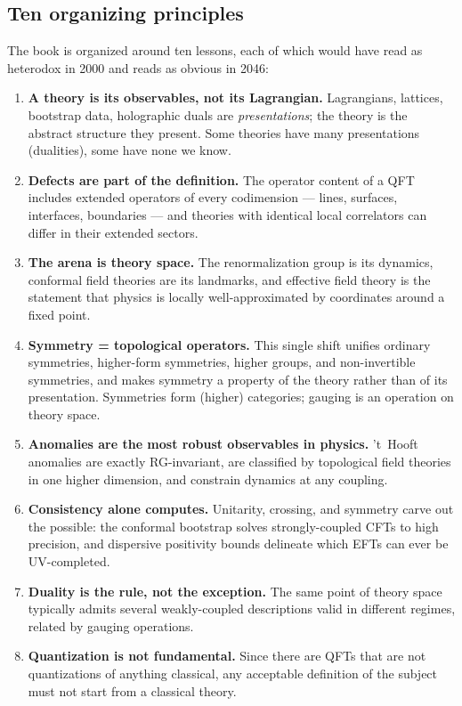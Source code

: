 \subsection*{Ten organizing principles}

The book is organized around ten lessons, each of which would have read as heterodox in 2000 and reads as obvious in 2046:

\begin{enumerate}
\item \textbf{A theory is its observables, not its Lagrangian.} Lagrangians, lattices, bootstrap data, holographic duals are \emph{presentations}; the theory is the abstract structure they present. Some theories have many presentations (dualities), some have none we know.
\item \textbf{Defects are part of the definition.} The operator content of a QFT includes extended operators of every codimension --- lines, surfaces, interfaces, boundaries --- and theories with identical local correlators can differ in their extended sectors.
\item \textbf{The arena is theory space.} The renormalization group is its dynamics, conformal field theories are its landmarks, and effective field theory is the statement that physics is locally well-approximated by coordinates around a fixed point.
\item \textbf{Symmetry = topological operators.} This single shift unifies ordinary symmetries, higher-form symmetries, higher groups, and non-invertible symmetries, and makes symmetry a property of the theory rather than of its presentation. Symmetries form (higher) categories; gauging is an operation on theory space.
\item \textbf{Anomalies are the most robust observables in physics.} 't~Hooft anomalies are exactly RG-invariant, are classified by topological field theories in one higher dimension, and constrain dynamics at any coupling.
\item \textbf{Consistency alone computes.} Unitarity, crossing, and symmetry carve out the possible: the conformal bootstrap solves strongly-coupled CFTs to high precision, and dispersive positivity bounds delineate which EFTs can ever be UV-completed.
\item \textbf{Duality is the rule, not the exception.} The same point of theory space typically admits several weakly-coupled descriptions valid in different regimes, related by gauging operations.
\item \textbf{Quantization is not fundamental.} Since there are QFTs that are not quantizations of anything classical, any acceptable definition of the subject must not start from a classical theory.

\end{enumerate}
